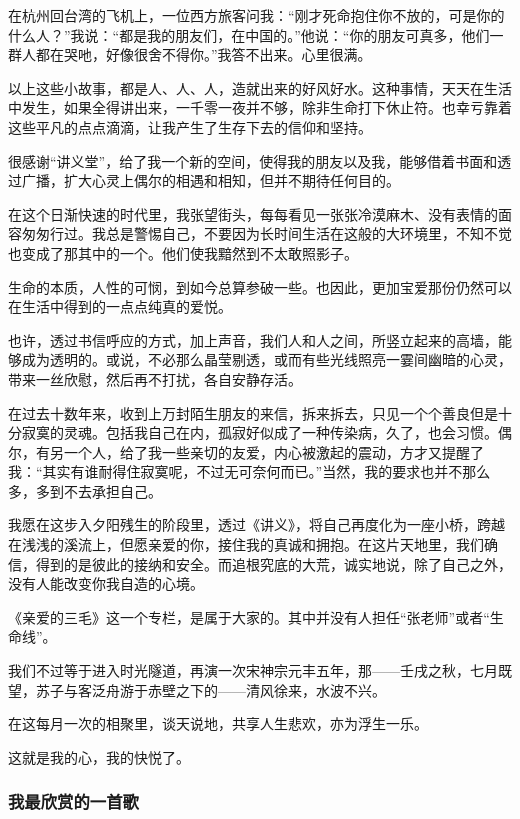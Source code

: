 \par 在杭州回台湾的飞机上，一位西方旅客问我：“刚才死命抱住你不放的，可是你的什么人？”我说：“都是我的朋友们，在中国的。”他说：“你的朋友可真多，他们一群人都在哭吔，好像很舍不得你。”我答不出来。心里很满。
\par 以上这些小故事，都是人、人、人，造就出来的好风好水。这种事情，天天在生活中发生，如果全得讲出来，一千零一夜并不够，除非生命打下休止符。也幸亏靠着这些平凡的点点滴滴，让我产生了生存下去的信仰和坚持。
\par 很感谢“讲义堂”，给了我一个新的空间，使得我的朋友以及我，能够借着书面和透过广播，扩大心灵上偶尔的相遇和相知，但并不期待任何目的。
\par 在这个日渐快速的时代里，我张望街头，每每看见一张张冷漠麻木、没有表情的面容匆匆行过。我总是警惕自己，不要因为长时间生活在这般的大环境里，不知不觉也变成了那其中的一个。他们使我黯然到不太敢照影子。
\par 生命的本质，人性的可悯，到如今总算参破一些。也因此，更加宝爱那份仍然可以在生活中得到的一点点纯真的爱悦。
\par 也许，透过书信呼应的方式，加上声音，我们人和人之间，所竖立起来的高墙，能够成为透明的。或说，不必那么晶莹剔透，或而有些光线照亮一霎间幽暗的心灵，带来一丝欣慰，然后再不打扰，各自安静存活。
\par 在过去十数年来，收到上万封陌生朋友的来信，拆来拆去，只见一个个善良但是十分寂寞的灵魂。包括我自己在内，孤寂好似成了一种传染病，久了，也会习惯。偶尔，有另一个人，给了我一些亲切的友爱，内心被激起的震动，方才又提醒了我：“其实有谁耐得住寂寞呢，不过无可奈何而已。”当然，我的要求也并不那么多，多到不去承担自己。
\par 我愿在这步入夕阳残生的阶段里，透过《讲义》，将自己再度化为一座小桥，跨越在浅浅的溪流上，但愿亲爱的你，接住我的真诚和拥抱。在这片天地里，我们确信，得到的是彼此的接纳和安全。而追根究底的大荒，诚实地说，除了自己之外，没有人能改变你我自造的心境。
\par 《亲爱的三毛》这一个专栏，是属于大家的。其中并没有人担任“张老师”或者“生命线”。
\par 我们不过等于进入时光隧道，再演一次宋神宗元丰五年，那——壬戌之秋，七月既望，苏子与客泛舟游于赤壁之下的——清风徐来，水波不兴。
\par 在这每月一次的相聚里，谈天说地，共享人生悲欢，亦为浮生一乐。
\par 这就是我的心，我的快悦了。




\subsubsection{我最欣赏的一首歌}

